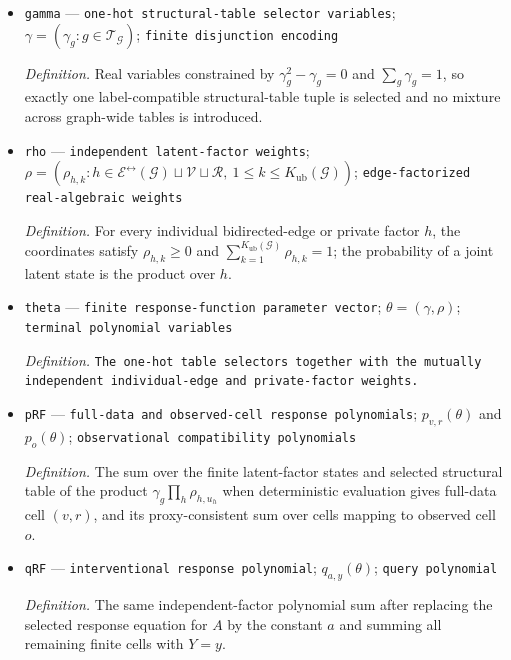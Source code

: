 \documentclass{article}
\begin{document}
\begin{itemize}
  \item \texttt{gamma} --- \texttt{one-\allowbreak{}hot structural-\allowbreak{}table selector variables}; \(\gamma=(\gamma_g:g\in\mathcal T_{\mathcal G})\); \texttt{finite disjunction encoding}
  \par\smallskip\noindent\emph{Definition.} Real variables constrained by \(\gamma_g^2-\gamma_g=0\) and \(\sum_g\gamma_g=1\), so exactly one label-compatible structural-table tuple is selected and no mixture across graph-wide tables is introduced.
  \item \texttt{rho} --- \texttt{independent latent-\allowbreak{}factor weights}; \(\rho=(\rho_{h,k}:h\in\mathcal E^{\leftrightarrow}(\mathcal G)\sqcup\mathcal V\sqcup\mathcal R,\ 1\leq k\leq K_{\mathrm{ub}}(\mathcal G))\); \texttt{edge-\allowbreak{}factorized real-\allowbreak{}algebraic weights}
  \par\smallskip\noindent\emph{Definition.} For every individual bidirected-edge or private factor \(h\), the coordinates satisfy \(\rho_{h,k}\geq0\) and \(\sum_{k=1}^{K_{\mathrm{ub}}(\mathcal G)}\rho_{h,k}=1\); the probability of a joint latent state is the product over \(h\).
  \item \texttt{theta} --- \texttt{finite response-\allowbreak{}function parameter vector}; \(\theta=(\gamma,\rho)\); \texttt{terminal polynomial variables}
  \par\smallskip\noindent\emph{Definition.} \texttt{The one-\allowbreak{}hot table selectors together with the mutually independent individual-\allowbreak{}edge and private-\allowbreak{}factor weights.}
  \item \texttt{pRF} --- \texttt{full-\allowbreak{}data and observed-\allowbreak{}cell response polynomials}; \(p_{v,r}(\theta)\) and \(p_o(\theta)\); \texttt{observational compatibility polynomials}
  \par\smallskip\noindent\emph{Definition.} The sum over the finite latent-factor states and selected structural table of the product \(\gamma_g\prod_h\rho_{h,u_h}\) when deterministic evaluation gives full-data cell \((v,r)\), and its proxy-consistent sum over cells mapping to observed cell \(o\).
  \item \texttt{qRF} --- \texttt{interventional response polynomial}; \(q_{a,y}(\theta)\); \texttt{query polynomial}
  \par\smallskip\noindent\emph{Definition.} The same independent-factor polynomial sum after replacing the selected response equation for \(A\) by the constant \(a\) and summing all remaining finite cells with \(Y=y\).

\end{itemize}
\end{document}
